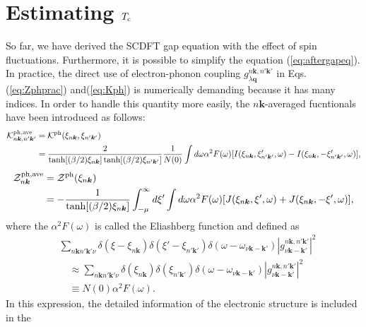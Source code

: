 \section{Estimating $T_{\rm c}$}
So far, we have derived the SCDFT gap equation with the effect of spin fluctuations.
Furthermore, it is possible to simplify the equation (\ref{eq:aftergapeq}).
In practice, the direct use of electron-phonon coupling $g^{n\bm k,n'\bm k'}_{\lambda\bm q}$ in
Eqs.(\ref{eq:Zphprac}) and(\ref{eq:Kph}) is numerically demanding because it has many indices.
In order to handle this quantity more easily, the $n\bm k$-averaged fucntionals have been
introduced\cite{Marques2005} as follows:
%
\begin{equation}
	\begin{split}
	\mathcal K^{\rm ph, ave}_{n\bm k, n'\bm k'} &= \mathcal K^{\rm ph}(\xi_{n\bm k},\xi_{n'\bm k'}) \\
	& = \frac{2}{\tanh[(\beta/2)\xi_{n\bm k}]\tanh[(\beta/2)\xi_{n'\bm k'}]}
	\frac{1}{N(0)} \int d\omega \alpha^2F(\omega)[I(\xi_{n\bm k},\xi'_{n' \bm k'},\omega) - I(\xi_{n\bm k},-\xi'_{n' \bm k'},\omega)],
	\label{eq:aveKph}
\end{split}
\end{equation}
%
\begin{equation}
	\begin{split}
	\mathcal Z^{\rm ph, ave}_{n \bm k} &= \mathcal Z^{\rm ph}(\xi_{n \bm k}) \\
	& = - \frac{1}{\tanh[(\beta/2)\xi_{n\bm k}]} \int_{-\mu}^{\infty} d\xi'
	\int d\omega \alpha^2F(\omega)[J(\xi_{n\bm k},\xi',\omega) + J(\xi_{n\bm k},-\xi', \omega)],
	\label{eq:aveZph}
\end{split}
\end{equation}
%
where the $\alpha^2F(\omega)$ is called the Eliashberg function and defined as
%
\begin{equation}
	\begin{split}
	& \sum_{n\bm k n'\bm k' \nu} \delta(\xi-\xi_{n\bm k})\delta(\xi'-\xi_{n'\bm k'})
	\delta(\omega-\omega_{\nu\bm k - \bm k'})|g^{n\bm k,n'\bm k'}_{\nu \bm k - \bm k'}|^2 \\
	&\quad \approx \sum_{n\bm k n'\bm k' \nu} \delta(\xi_{n\bm k})\delta(\xi_{n'\bm k'})
	\delta(\omega-\omega_{\nu\bm k - \bm k'}) |g^{n\bm k,n'\bm k'}_{\nu \bm k - \bm k'}|^2 \\
 	&\quad \equiv N(0)\alpha^2F(\omega).
	\label{eq:a2F}
\end{split}
\end{equation}
%
In this expression, the detailed information of the electronic structure is included in the
